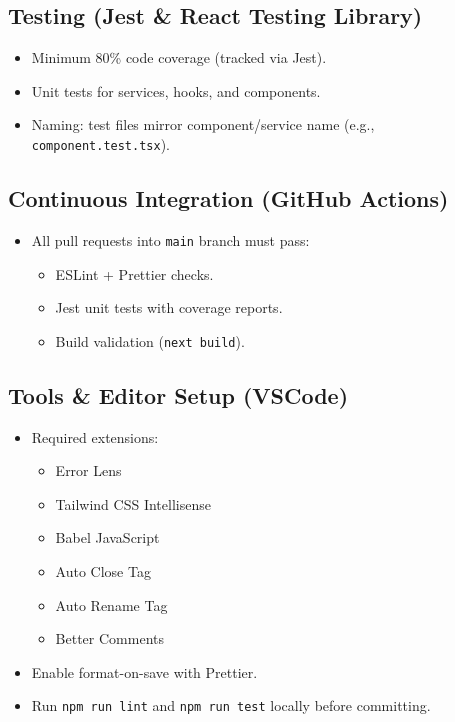 \documentclass{article}
\begin{document}
\subsection*{Testing (Jest \& React Testing Library)}
\begin{itemize}
  \item Minimum 80\% code coverage (tracked via Jest).
  \item Unit tests for services, hooks, and components.
  \item Naming: test files mirror component/service name (e.g., \texttt{component.test.tsx}).
\end{itemize}

\subsection*{Continuous Integration (GitHub Actions)}
\begin{itemize}
  \item All pull requests into \texttt{main} branch must pass:
    \begin{itemize}
      \item ESLint + Prettier checks.
      \item Jest unit tests with coverage reports.
      \item Build validation (\texttt{next build}).
    \end{itemize}
\end{itemize}

\subsection*{Tools \& Editor Setup (VSCode)}
\begin{itemize}
  \item Required extensions:
    \begin{itemize}
      \item Error Lens
      \item Tailwind CSS Intellisense
      \item Babel JavaScript
      \item Auto Close Tag
      \item Auto Rename Tag
      \item Better Comments
    \end{itemize}
  \item Enable format-on-save with Prettier.
  \item Run \texttt{npm run lint} and \texttt{npm run test} locally before committing.
\end{itemize}
\end{document}
